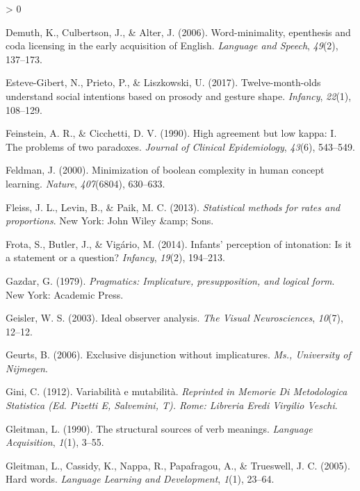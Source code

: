 \documentclass[
  english,
  ,man,floatsintext]{apa6}
\newlength{\cslhangindent}
\newenvironment{CSLReferences}[2] %
 {%
  \setlength{\parindent}{0pt}
  \ifodd #1 \everypar{\setlength{\hangindent}{\cslhangindent}}\ignorespaces\fi
  \ifnum #2 > 0
  \setlength{\parskip}{#2\baselineskip}
  \fi
 }%
 {}
\begin{document}
\begin{CSLReferences}{1}{0}
\leavevmode\hypertarget{ref-demuth2006word}{}%
Demuth, K., Culbertson, J., \& Alter, J. (2006). Word-minimality, epenthesis and coda licensing in the early acquisition of {E}nglish. \emph{Language and Speech}, \emph{49}(2), 137--173.

\leavevmode\hypertarget{ref-esteve2017twelve}{}%
Esteve-Gibert, N., Prieto, P., \& Liszkowski, U. (2017). Twelve-month-olds understand social intentions based on prosody and gesture shape. \emph{Infancy}, \emph{22}(1), 108--129.

\leavevmode\hypertarget{ref-feinstein1990high}{}%
Feinstein, A. R., \& Cicchetti, D. V. (1990). High agreement but low kappa: I. The problems of two paradoxes. \emph{Journal of Clinical Epidemiology}, \emph{43}(6), 543--549.

\leavevmode\hypertarget{ref-feldman2000minimization}{}%
Feldman, J. (2000). Minimization of boolean complexity in human concept learning. \emph{Nature}, \emph{407}(6804), 630--633.

\leavevmode\hypertarget{ref-fleiss2013statistical}{}%
Fleiss, J. L., Levin, B., \& Paik, M. C. (2013). \emph{Statistical methods for rates and proportions}. New York: John Wiley \&amp; Sons.

\leavevmode\hypertarget{ref-frota2014infants}{}%
Frota, S., Butler, J., \& Vigário, M. (2014). Infants' perception of intonation: Is it a statement or a question? \emph{Infancy}, \emph{19}(2), 194--213.

\leavevmode\hypertarget{ref-gazdar79}{}%
Gazdar, G. (1979). \emph{Pragmatics: Implicature, presupposition, and logical form}. New York: Academic Press.

\leavevmode\hypertarget{ref-geisler2003ideal}{}%
Geisler, W. S. (2003). Ideal observer analysis. \emph{The Visual Neurosciences}, \emph{10}(7), 12--12.

\leavevmode\hypertarget{ref-geurts2006exclusive}{}%
Geurts, B. (2006). Exclusive disjunction without implicatures. \emph{Ms., University of Nijmegen}.

\leavevmode\hypertarget{ref-gini1912variabilita}{}%
Gini, C. (1912). Variabilit{à} e mutabilit{à}. \emph{Reprinted in Memorie Di Metodologica Statistica (Ed. Pizetti E, Salvemini, T). Rome: Libreria Eredi Virgilio Veschi}.

\leavevmode\hypertarget{ref-gleitman1990structural}{}%
Gleitman, L. (1990). The structural sources of verb meanings. \emph{Language Acquisition}, \emph{1}(1), 3--55.

\leavevmode\hypertarget{ref-gleitman2005hard}{}%
Gleitman, L., Cassidy, K., Nappa, R., Papafragou, A., \& Trueswell, J. C. (2005). Hard words. \emph{Language Learning and Development}, \emph{1}(1), 23--64.


\end{CSLReferences}
\end{document}
